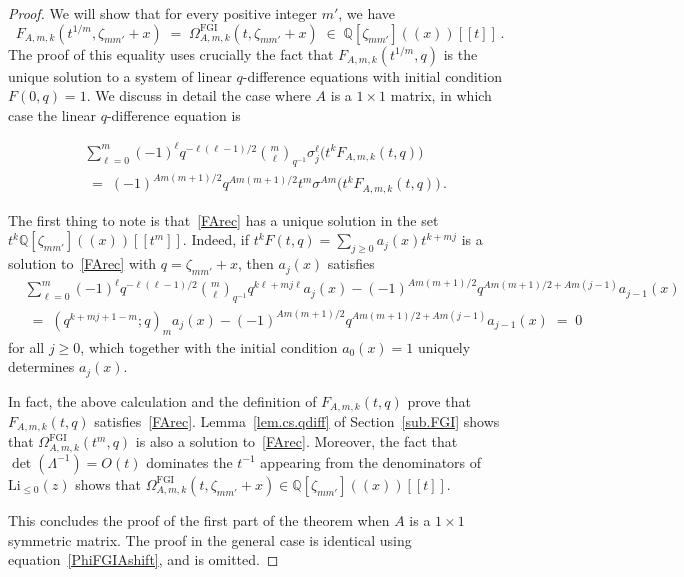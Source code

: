 \documentclass[12pt,reqno]{amsart}
\theoremstyle{definition}
\def\BQ{\mathbb Q}
\def\s{\sigma}
\def\Li{\mathrm{Li}}
\def\be{\begin{equation}}
\def\ee{\end{equation}}
\def\z{\zeta}
\def\={\;=\;}
\def\inn{\;\in\;}
\def\FGI{\mathrm{FGI}}
\def\CS{\Omega^{\FGI}}
\begin{document}
\begin{proof}
We will show that for every positive integer $m'$, we have 
\be
\label{thm1.tx}
F_{A,m,k}(t^{1/m},\z_{mm'}+x) \= \CS_{A,m,k}(t,\z_{mm'}+x) \inn
\BQ[\z_{mm'}](\!(x)\!)[\![t]\!] \,.
\ee
The proof of this equality uses crucially the fact that $F_{A,m,k}(t^{1/m},q)$
is the unique solution to a system of linear $q$-difference equations with initial
condition $F(0,q)=1$.
We discuss in detail the case where $A$ is a $1 \times 1$ matrix, in which case
the linear $q$-difference equation is


\be
\label{FArec}
\begin{aligned}
&\sum_{\ell=0}^{m}(-1)^{\ell}q^{-\ell(\ell-1)/2}
\binom{m}{\ell}_{\!\!q^{-1}}\s_j^{\ell}\Big(t^{k}F_{A,m,k}(t,q)\Big)\\
&\=
(-1)^{Am(m+1)/2}q^{Am(m+1)/2}t^{m} \s^{Am}\Big(t^{k}F_{A,m,k}(t,q)\Big)\,.
\end{aligned}
\ee

The first thing to note is that~\eqref{FArec} has a unique solution in the set
$t^k\BQ[\z_{mm'}](\!(x)\!)[\![t^{m}]\!]$. Indeed, if
$t^kF(t,q) = \sum_{j \geq 0} a_j(x) t^{k+mj}$ is
a solution to~\eqref{FArec} with $q=\z_{mm'}+x$, then $a_j(x)$ satisfies
\be
\begin{aligned}
  &\sum_{\ell=0}^{m}(-1)^{\ell}q^{-\ell(\ell-1)/2}
  \binom{m}{\ell}_{\!\!q^{-1}}q^{k\ell+mj\ell}a_j(x)
- (-1)^{Am(m+1)/2}q^{Am(m+1)/2+Am(j-1)}a_{j-1}(x)\\
&\=(q^{k+mj+1-m};q)_{m}a_j(x)-(-1)^{Am(m+1)/2}q^{Am(m+1)/2+Am(j-1)}a_{j-1}(x)
\= 0
\end{aligned}
\ee
for all $j \geq 0$, which together with the initial condition $a_0(x)=1$ uniquely
determines $a_j(x)$.

In fact, the above calculation and the definition of $F_{A,m,k}(t,q)$
prove that $F_{A,m,k}(t,q)$ satisfies~\eqref{FArec}.
Lemma~\ref{lem.cs.qdiff} of Section~\ref{sub.FGI} shows that $\CS_{A,m,k}(t^{m},q)$
is also a solution to~\eqref{FArec}. Moreover, the
fact that $\det(\Lambda^{-1})=O(t)$ dominates the $t^{-1}$ appearing from the
denominators of $\Li_{\leq0}(z)$ shows that
$\CS_{A,m,k}(t,\z_{mm'}+x)\in\BQ[\z_{mm'}](\!(x)\!)[\![t]\!]$.

This concludes the proof of the first part of the theorem when $A$ is a $1 \times 1$
symmetric matrix. The proof in the general case is identical using
equation~\eqref{PhiFGIAshift}, and is omitted. 
\end{proof}
\end{document}
